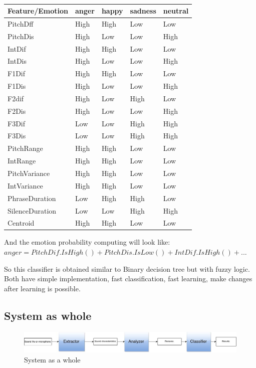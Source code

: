 \documentclass[12pt, letterpaper]{article}
\begin{document}
\begin{table}[h]
	\centering
		\begin{tabular}{l|l|l|l|l|}
			\hline
				Feature/Emotion& anger&	happy	&sadness	&neutral\\ \hline
PitchDff&	High	&High	&Low	&Low\\ \hline 
PitchDis&	High	&Low&	Low&	High\\ \hline
IntDif&	High&	High&	Low&	Low\\ \hline
IntDis	&High	&Low&	Low&	High\\ \hline
F1Dif&	High&	High&	Low&	Low\\ \hline
F1Dis&	High	&Low&	Low&	High\\ \hline
F2dif	&High&	Low&	High&	Low\\ \hline
F2Dis&	High&	Low&	Low	&High\\ \hline
F3Dif&	Low&	Low&	High&	High\\ \hline
F3Dis&	Low	&Low&	High&	High\\ \hline
PitchRange&	High&	High&Low&	Low\\ \hline
IntRange&	High&	High&	Low&	Low\\ \hline
PitchVariance&	High&	High&Low&	Low\\ \hline
IntVariance	&High&	High&	Low	&Low\\ \hline
PhraseDuration&	Low&	High&	High	&Low\\ \hline
SilenceDuration	&Low	&Low	&High&	High\\ \hline
Centroid&	High	&High&	Low&	Low\\ \hline
 \hline
		\end{tabular}
	\caption{}
	\label{tab:}
\end{table}

And the emotion probability computing will look like:\\ $anger=PitchDif.IsHigh() + PitchDis.IsLow() + IntDif.IsHigh() + ...$

So this classifier is obtained similar to Binary decision tree but with fuzzy logic. Both have simple implementation, fast classification, fast learning, make changes after learning is possible.
\subsection{System as whole}

\begin{figure}[h]
	\centering
		\includegraphics[scale=0.3]{images/components.png}
	\caption{System as a whole}
	\label{fig:system}
\end{figure}
\end{document}
